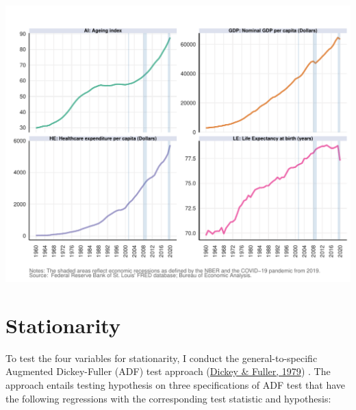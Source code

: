 \documentclass[11pt,preprint, authoryear]{elsarticle}
\let\origfigure\figure
\let\endorigfigure\endfigure
\renewenvironment{figure}[1][2] {
    \expandafter\origfigure\expandafter[H]
} {
    \endorigfigure
}
\numberwithin{equation}{section}
\numberwithin{figure}{section}
\numberwithin{table}{section}
\begin{document}
\begin{figure}[H]
\includegraphics{19025831_files/figure-latex/Visualising the data-1} \caption{Time series data sampled. \label{data}}\label{fig:Visualising the data}
\end{figure}

\hypertarget{stationarity}{%
\section{\texorpdfstring{Stationarity
\label{stationarity}}{Stationarity }}\label{stationarity}}

To test the four variables for stationarity, I conduct the
general-to-specific Augmented Dickey-Fuller (ADF) test approach
(\protect\hyperlink{ref-dickey1979}{Dickey \& Fuller, 1979}) . The
approach entails testing hypothesis on three specifications of ADF test
that have the following regressions with the corresponding test
statistic and hypothesis:
\end{document}

